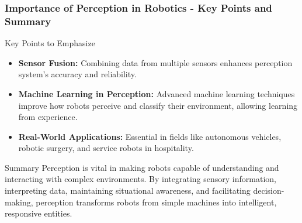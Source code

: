 \documentclass{beamer}
\begin{document}
\begin{frame}[fragile]
    \frametitle{Importance of Perception in Robotics - Key Points and Summary}
    \begin{block}{Key Points to Emphasize}
        \begin{itemize}
            \item \textbf{Sensor Fusion:} Combining data from multiple sensors enhances perception system's accuracy and reliability.
            \item \textbf{Machine Learning in Perception:} Advanced machine learning techniques improve how robots perceive and classify their environment, allowing learning from experience.
            \item \textbf{Real-World Applications:} Essential in fields like autonomous vehicles, robotic surgery, and service robots in hospitality.
        \end{itemize}
    \end{block}
    
    \begin{block}{Summary}
        Perception is vital in making robots capable of understanding and interacting with complex environments. By integrating sensory information, interpreting data, maintaining situational awareness, and facilitating decision-making, perception transforms robots from simple machines into intelligent, responsive entities.
    \end{block}
\end{frame}
\end{document}
